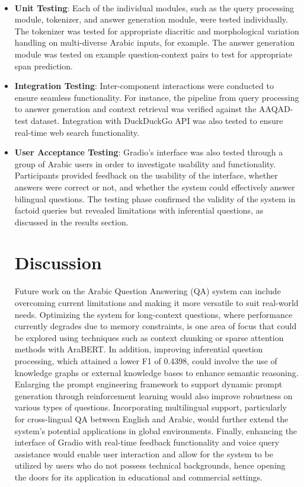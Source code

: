 \documentclass[conference]{IEEEtran}
\begin{document}
\\\begin{itemize}

\item \textbf{Unit Testing}: Each of the individual modules, such as the query processing module, tokenizer, and answer generation module, were tested individually. The tokenizer was tested for appropriate diacritic and morphological variation handling on multi-diverse Arabic inputs, for example. The answer generation module was tested on example question-context pairs to test for appropriate span prediction.
\item \textbf{Integration Testing}: Inter-component interactions were conducted to ensure seamless functionality. For instance, the pipeline from query processing to answer generation and context retrieval was verified against the AAQAD-test dataset. Integration with DuckDuckGo API was also tested to ensure real-time web search functionality.
\item \textbf{User Acceptance Testing}: Gradio's interface was also tested through a group of Arabic users in order to investigate usability and functionality. Participants provided feedback on the usability of the interface, whether answers were correct or not, and whether the system could effectively answer bilingual questions. The testing phase confirmed the validity of the system in factoid queries but revealed limitations with inferential questions, as discussed in the results section.
\section{Discussion}
Future work on the Arabic Question Answering (QA) system can include overcoming current limitations and making it more versatile to suit real-world needs. Optimizing the system for long-context questions, where performance currently degrades due to memory constraints, is one area of focus that could be explored using techniques such as context chunking or sparse attention methods with AraBERT. In addition, improving inferential question processing, which attained a lower F1 of 0.4398, could involve the use of knowledge graphs or external knowledge bases to enhance semantic reasoning. Enlarging the prompt engineering framework to support dynamic prompt generation through reinforcement learning would also improve robustness on various types of questions. Incorporating multilingual support, particularly for cross-lingual QA between English and Arabic, would further extend the system's potential applications in global environments. Finally, enhancing the interface of Gradio with real-time feedback functionality and voice query assistance would enable user interaction and allow for the system to be utilized by users who do not possess technical backgrounds, hence opening the doors for its application in educational and commercial settings.
\end{itemize}
\end{document}
